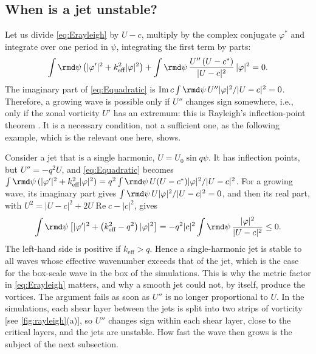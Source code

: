 \subsection{When is a jet unstable?}\label{app:rayleigh_theorem}

Let us divide \cref{eq:Erayleigh} by \(U - c\), multiply by the complex conjugate \(\varphi^*\) and integrate over one period in \(\psi\), integrating the first term by parts:
\begin{equation}
\int\rmd\psi\left(|\varphi'|^2 + k_\text{eff}^2|\varphi|^2\right) + \int\rmd\psi\,\frac{U''\,(U - c^*)}{|U - c|^2}\,|\varphi|^2 = 0.
\label{eq:Equadratic}
\end{equation}
The imaginary part of \cref{eq:Equadratic} is \(\operatorname{Im}c\int\rmd\psi\,U''|\varphi|^2/|U - c|^2 = 0\). Therefore, a growing wave is possible only if \(U''\) changes sign somewhere, i.e., only if the zonal vorticity \(U'\) has an extremum: this is Rayleigh's inflection-point theorem \citep{Rayleigh1880, DrazinReid2004}. It is a necessary condition, not a sufficient one, as the following example, which is the relevant one here, shows.

Consider a jet that is a single harmonic, \(U = U_0\sin q\psi\). It has inflection points, but \(U'' = -q^2U\), and \cref{eq:Equadratic} becomes \(\int\rmd\psi\,(|\varphi'|^2 + k_\text{eff}^2|\varphi|^2) = q^2\int\rmd\psi\,U(U - c^*)|\varphi|^2/|U - c|^2\). For a growing wave, its imaginary part gives \(\int\rmd\psi\,U|\varphi|^2/|U - c|^2 = 0\), and then its real part, with \(U^2 = |U - c|^2 + 2U\operatorname{Re}c - |c|^2\), gives
\begin{equation}
\int\rmd\psi\left[|\varphi'|^2 + \left(k_\text{eff}^2 - q^2\right)|\varphi|^2\right] = -q^2|c|^2\int\rmd\psi\,\frac{|\varphi|^2}{|U - c|^2}\leq0.
\label{eq:Eharmonic}
\end{equation}
The left-hand side is positive if \(k_\text{eff} > q\). Hence a single-harmonic jet is stable to all waves whose effective wavenumber exceeds that of the jet, which is the case for the box-scale wave in the box of the simulations. This is why the metric factor in \cref{eq:Erayleigh} matters, and why a smooth jet could not, by itself, produce the vortices. The argument fails as soon as \(U''\) is no longer proportional to \(U\). In the simulations, each shear layer between the jets is split into two strips of vorticity [see \cref{fig:rayleigh}(a)], so \(U''\) changes sign within each shear layer, close to the critical layers, and the jets are unstable. How fast the wave then grows is the subject of the next subsection.

